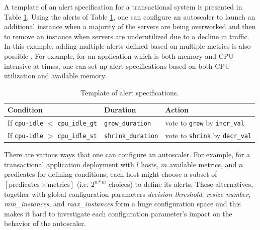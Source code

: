 A template of an alert specification for a transactional system is presented in Table \ref{tab:alerts-spec-example}. 
Using the alerts of Table \ref{tab:alerts-spec-example}, one can configure an autoscaler to launch an additional instance when a majority of the servers are being overworked and then to remove an instance when servers are underutilized due to a decline in traffic.  
In this example, adding multiple alerts defined based on multiple metrics is also possible . For example, for an application which is both memory and CPU intensive at times, one can set up alert specifications based on both CPU utilization and available memory. 

	
\begin{scriptsize}
\begin{table}[b]
\center
\begin{tabular}{ |l|l|l| }
\hline 
Condition & Duration & Action \\
\hline \hline 
If \texttt{cpu-idle} $<$ \texttt{cpu\_idle\_gt} &  \texttt{grow\_duration}  & vote to \texttt{grow} by \texttt{incr\_val}  \\
If \texttt{cpu-idle} $>$ \texttt{cpu\_idle\_st} &  \texttt{shrink\_duration}  & vote to \texttt{shrink} by \texttt{decr\_val} \\
\hline 
\end{tabular}
	\caption{Template of alert specifications.}
	\label{tab:alerts-spec-example}
\end{table}
\end{scriptsize}

There are various ways that one can configure an autoscaler. 
For example, for a transactional application deployment with $l$ hosts, $m$ available metrics, and $n$ predicates for defining conditions,
 each host might choose a subset of $[\text{predicates} \times \text{metrics}]$ (i.e. $2^{n*m}$ choices) to define its alerts.
These alternatives, together with global configuration parameters \textit{decision threshold}, \textit{resize number}, \textit{min\_instances}, and \textit{max\_instances} form a huge configuration space and this makes it hard to investigate each configuration parameter's impact on the behavior of the autoscaler.    

